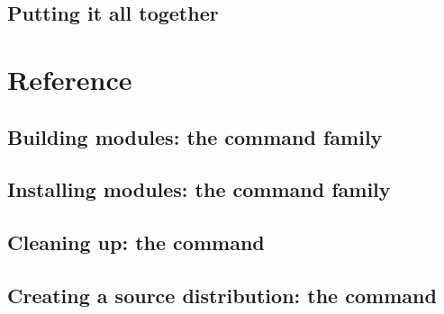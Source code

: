 \documentclass{howto}
\begin{document}
\subsection{Putting it all together}


\section{Reference}
\label{sec:ref}


\subsection{Building modules: the \protect{} command family}
\label{sec:build-cmds}

\subsubsection{\protect{}}
\label{sec:build-cmd}

\subsubsection{\protect{}}
\label{sec:build-py-cmd}

\subsubsection{\protect{}}
\label{sec:build-ext-cmd}

\subsubsection{\protect{}}
\label{sec:build-clib-cmd}


\subsection{Installing modules: the \protect{} command family}
\label{sec:install-cmd}


\subsection{Cleaning up: the \protect{} command}
\label{sec:clean-cmd}


\subsection{Creating a source distribution: the \protect{} command}
\label{sec:sdist-cmd}
\end{document}
